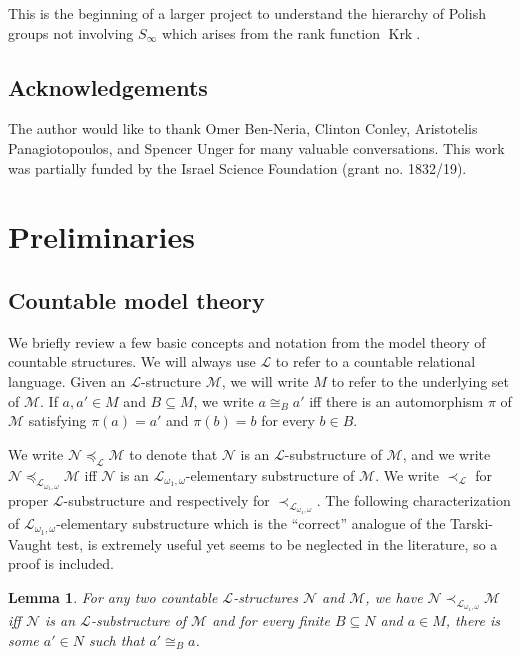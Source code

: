 \documentclass[12pt]{amsart}
\theoremstyle{plain}
\newtheorem{lemma}[theorem]{Lemma}
\theoremstyle{definition}
\newcommand{\isom}{\cong}
\newcommand{\mcL}{\mathcal{L}}
\newcommand{\mcM}{\mathcal{M}}
\newcommand{\mcN}{\mathcal{N}}
\DeclareMathOperator{\Krk}{Krk}
\begin{document}
This is the beginning of a larger project to understand the hierarchy of Polish groups not involving $S_\infty$ which arises from the rank function $\Krk$.

\subsection{Acknowledgements}
The author would like to thank Omer Ben-Neria, Clinton Conley, Aristotelis Panagiotopoulos, and Spencer Unger for many valuable conversations. This work was partially funded by the Israel Science Foundation (grant no. 1832/19).

\section{Preliminaries}

\subsection{Countable model theory}

We briefly review a few basic concepts and notation from the model theory of countable structures.
We will always use $\mcL$ to refer to a countable relational language.
Given an $\mcL$-structure $\mcM$, we will write $M$ to refer to the underlying set of $\mcM$.
If $a, a' \in M$ and $B \subseteq M$, we write $a \isom_B a'$ iff there is an automorphism $\pi$ of $\mcM$ satisfying $\pi(a) = a'$ and $\pi(b) = b$ for every $b \in B$.

We write $\mcN \preceq_{\mcL} \mcM$ to denote that $\mcN$ is an $\mcL$-substructure of $\mcM$, and we write $\mcN \preceq_{\mcL_{\omega_1, \omega}} \mcM$ iff $\mcN$ is an $\mcL_{\omega_1, \omega}$-elementary substructure of $\mcM$.
We write $\prec_{\mcL}$ for proper $\mcL$-substructure and respectively for $\prec_{\mcL_{\omega_1, \omega}}$.
The following characterization of $\mcL_{\omega_1, \omega}$-elementary substructure which is the ``correct'' analogue of the Tarski-Vaught test, is extremely useful yet seems to be neglected in the literature, so a proof is included.

\begin{lemma}\label{lem:elementary_substructure}
For any two countable $\mcL$-structures $\mcN$ and $\mcM$, we have $\mcN \prec_{\mcL_{\omega_1, \omega}} \mcM$ iff $\mcN$ is an $\mcL$-substructure of $\mcM$ and for every finite $B \subseteq N$ and $a \in M$, there is some $a' \in N$ such that $a' \isom_B a$.
\end{lemma}
\end{document}
